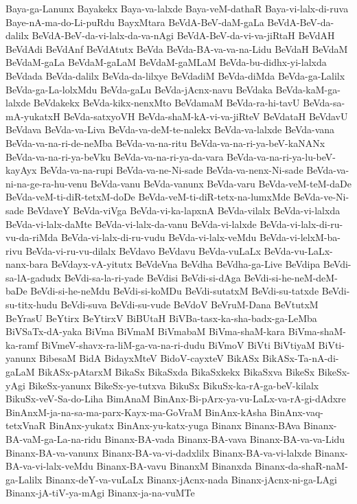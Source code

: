 {Baya-ga-Lanunx
Bayakekx
Baya-va-lalxde
Baya-veM-dathaR
Baya-vi-lalx-di-ruva
Baye-nA-ma-do-Li-puRdu
BayxMtara
BeVdA-BeV-daM-gaLa
BeVdA-BeV-da-dalilx
BeVdA-BeV-da-vi-lalx-da-va-nAgi
BeVdA-BeV-da-vi-va-jiRtaH
BeVdAH
BeVdAdi
BeVdAnf
BeVdAtutx
BeVda
BeVda-BA-va-va-na-Lidu
BeVdaH
BeVdaM
BeVdaM-gaLa
BeVdaM-gaLaM
BeVdaM-gaMLaM
BeVda-bu-didhx-yi-lalxda
BeVdada
BeVda-dalilx
BeVda-da-lilxye
BeVdadiM
BeVda-diMda
BeVda-ga-Lalilx
BeVda-ga-La-lolxMdu
BeVda-gaLu
BeVda-jAcnx-navu
BeVdaka
BeVda-kaM-ga-lalxde
BeVdakekx
BeVda-kikx-nenxMto
BeVdamaM
BeVda-ra-hi-tavU
BeVda-sa-mA-yukatxH
BeVda-satxyoVH
BeVda-shaM-kA-vi-va-jiRteV
BeVdataH
BeVdavU
BeVdava
BeVda-va-Liva
BeVda-va-deM-te-nalekx
BeVda-va-lalxde
BeVda-vana
BeVda-va-na-ri-de-neMba
BeVda-va-na-ritu
BeVda-va-na-ri-ya-beV-kaNANx
BeVda-va-na-ri-ya-beVku
BeVda-va-na-ri-ya-da-vara
BeVda-va-na-ri-ya-lu-beV-kayAyx
BeVda-va-na-rupi
BeVda-va-ne-Ni-sade
BeVda-va-nenx-Ni-sade
BeVda-va-ni-na-ge-ra-hu-venu
BeVda-vanu
BeVda-vanunx
BeVda-varu
BeVda-veM-teM-daDe
BeVda-veM-ti-diR-tetxM-doDe
BeVda-veM-ti-diR-tetx-na-lumxMde
BeVda-ve-Ni-sade
BeVdaveY
BeVda-viVga
BeVda-vi-ka-lapxnA
BeVda-vilalx
BeVda-vi-lalxda
BeVda-vi-lalx-daMte
BeVda-vi-lalx-da-vanu
BeVda-vi-lalxde
BeVda-vi-lalx-di-ru-vu-da-riMda
BeVda-vi-lalx-di-ru-vudu
BeVda-vi-lalx-veMdu
BeVda-vi-lelxM-ba-rivu
BeVda-vi-ru-vu-dilalx
BeVdavo
BeVdavu
BeVda-vuLaLx
BeVda-vu-LaLx-nanx-bara
BeVdayx-vA-yitutx
BeVdeVna
BeVdha
BeVdha-ga-Live
BeVdipa
BeVdi-sa-lA-gadudx
BeVdi-sa-la-ri-yade
BeVdisi
BeVdi-si-dAga
BeVdi-si-he-neM-deM-baDe
BeVdi-si-he-neMdu
BeVdi-si-koMDu
BeVdi-sutatxM
BeVdi-su-tatxde
BeVdi-su-titx-hudu
BeVdi-suva
BeVdi-su-vude
BeVdoV
BeVruM-Dana
BeVtutxM
BeYrasU
BeYtirx
BeYtirxV
BiBUtaH
BiVBa-tasx-ka-sha-badx-ga-LeMba
BiVSaTx-dA-yaka
BiVma
BiVmaM
BiVmabaM
BiVma-shaM-kara
BiVma-shaM-ka-ramf
BiVmeV-shavx-ra-liM-ga-va-na-ri-dudu
BiVmoV
BiVti
BiVtiyaM
BiVti-yanunx
BibesaM
BidA
BidayxMteV
BidoV-cayxteV
BikASx
BikASx-Ta-nA-di-gaLaM
BikASx-pAtarxM
BikaSx
BikaSxda
BikaSxkekx
BikaSxva
BikeSx
BikeSx-yAgi
BikeSx-yanunx
BikeSx-ye-tutxva
BikuSx
BikuSx-ka-rA-ga-beV-kilalx
BikuSx-veV-Sa-do-Liha
BimAnaM
BinAnx-Bi-pArx-ya-vu-LaLx-va-rA-gi-dAdxre
BinAnxM-ja-na-sa-ma-parx-Kayx-ma-GoVraM
BinAnx-kAsha
BinAnx-vaq-tetxVnaR
BinAnx-yukatx
BinAnx-yu-katx-yuga
Binanx
Binanx-BAva
Binanx-BA-vaM-ga-La-na-ridu
Binanx-BA-vada
Binanx-BA-vava
Binanx-BA-va-va-Lidu
Binanx-BA-va-vanunx
Binanx-BA-va-vi-dadxlilx
Binanx-BA-va-vi-lalxde
Binanx-BA-va-vi-lalx-veMdu
Binanx-BA-vavu
BinanxM
Binanxda
Binanx-da-shaR-naM-ga-Lalilx
Binanx-deY-va-vuLaLx
Binanx-jAcnx-nada
Binanx-jAcnx-ni-ga-LAgi
Binanx-jA-tiV-ya-mAgi
Binanx-ja-na-vuMTe
}
